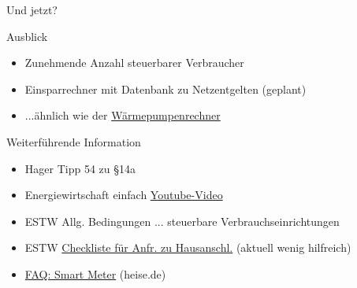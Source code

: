 \begin{frame}{Und jetzt?}
   \begin{block}{Ausblick}
      \begin{itemize}
         \item Zunehmende Anzahl steuerbarer Verbraucher
         \item Einsparrechner mit Datenbank zu Netzentgelten (geplant)
         \item ...ähnlich wie der \href{https://waermepumpenrechner.streamlit.app/}{Wärmepumpenrechner}
      \end{itemize}
   \end{block}

   \vspace{0.5cm}
   \begin{block}{Weiterführende Information}
      \begin{itemize}
         \item Hager Tipp 54\cite{HagerTipp54_2024} zu §14a
         \item Energiewirtschaft einfach \href{https://www.youtube.com/watch?v=N_o7TpAXCUA}{Youtube-Video}
         \item ESTW Allg. Bedingungen ... steuerbare Verbrauchseinrichtungen\cite{ESTW2024AllgBedstVEP14a}
         \item ESTW \href{https://netze.estw.de/de/Checkliste-fuer-Anfragen-zu-Hausanschluessen/Checkliste-fuer-Anfragen-zu-Hausanschluessen.html}{Checkliste für Anfr. zu Hausanschl.} (aktuell wenig hilfreich)
         \item \href{https://www.heise.de/ratgeber/FAQ-Smart-Meter-10354216.html}{FAQ: Smart Meter} (heise.de)
      \end{itemize}
   \end{block}
\end{frame}


